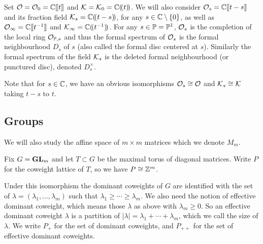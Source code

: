 \documentclass[draft]{article}
\begin{document}
Set $\cO = \cO_0 = \CC\xt$ and $\cK = \cK_0 = \CC\xT$.
We will also consider $\cO_s = \CC\xt[t-s]$ and its fraction field $\cK_s=\CC\xT[t-s]$, for any 
$ s \in \CC\setminus\{0\} $, as well as $ \Oinf = \CC\xt[t^{-1}] $ and $\Kinf = \CC\xT[t^{-1}]$. For any $ s \in \PP = \PP^1$, 
$ \cO_s$ is the completion of the local ring $ \mathcal O_{\PP, s} $ and thus the formal spectrum of $ \cO_s$ is the formal neighbourhood $ D_s$ of $ s $ (also called the formal disc centered at $ s$).  Similarly the formal spectrum of the field $\cK_s$ is the deleted formal neighbourhood (or punctured disc), denoted $ D_s^\times$.

Note that for $ s \in \CC $, we have an obvious isomorphisms  $\cO_s \cong \cO$ and $\cK_s\cong\cK$ taking $ t-s $ to $ t$. 

\subsection{Groups}

We will also study the affine space of $m\times m$ matrices which we denote $ M_m$.

Fix $G = \GL_m$ and let $T\subset G$ be the maximal torus of diagonal matrices. 
Write $P$ for the coweight lattice of $T$, so we have $P\cong \ZZ^m$.  

Under this isomorphism the dominant coweights of $ G $ 
are identified with the set of $ \lambda = (\lambda_1, \dots, \lambda_m) $ such that $ \lambda_1 \ge \cdots \ge \lambda_m$. 
We also need the notion of effective dominant coweight, 
which means those $ \lambda $ as above with $ \lambda_m \ge 0$.  So an effective dominant coweight $ \lambda $ is a partition of $|\lambda| = \lambda_1 + \cdots + \lambda_m$, which we call the size of $ \lambda$. We write $P_+$ for the set of dominant coweights, and $P_{++}$ for the set of effective dominant coweights. 
\end{document}
